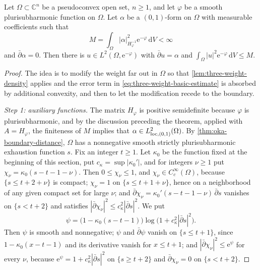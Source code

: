 \begin{theorem}[H\"ormander]\label{thm:hormander-smooth-weight}
Let $\Omega\subset\mathbb C^n$ be a pseudoconvex open set, $n\ge1$, and let $\varphi$ be a smooth plurisubharmonic function on $\Omega$. Let $\alpha$ be a $(0,1)$-form on $\Omega$ with measurable coefficients such that
\[
 M=\int_\Omega|\alpha|_{H_\varphi^{-1}}^2\mathrm e^{-\varphi}\,\mathrm dV<\infty
\]
and $\bar\partial\alpha=0$. Then there is $u\in L^2(\Omega,\mathrm e^{-\varphi})$ with $\bar\partial u=\alpha$ and $\int_\Omega|u|^2\mathrm e^{-\varphi}\,\mathrm dV\le M$.
\end{theorem}
\begin{proof}
The idea is to modify the weight far out in $\Omega$ so that \cref{lem:three-weight-density} applies and the error term in \eqref{eq:three-weight-basic-estimate} is absorbed by additional convexity, and then to let the modification recede to the boundary.

\emph{Step 1: auxiliary functions.} The matrix $H_\varphi$ is positive semidefinite because $\varphi$ is plurisubharmonic, and by the discussion preceding the theorem, applied with $A=H_\varphi$, the finiteness of $M$ implies that $\alpha\in L^2_{\mathrm{loc},(0,1)}(\Omega)$. By \cref{thm:oka-boundary-distance}, $\Omega$ has a nonnegative smooth strictly plurisubharmonic exhaustion function $s$. Fix an integer $t\ge1$. Let $\kappa_0$ be the function fixed at the beginning of this section, put $c_\kappa=\sup|\kappa_0'|$, and for integers $\nu\ge1$ put $\chi_\nu=\kappa_0(s-t-1-\nu)$. Then $0\le\chi_\nu\le1$, and $\chi_\nu\in C^\infty_c(\Omega)$, because $\{s\le t+2+\nu\}$ is compact; $\chi_\nu=1$ on $\{s\le t+1+\nu\}$, hence on a neighborhood of any given compact set for large $\nu$; and $\bar\partial\chi_\nu=\kappa_0'(s-t-1-\nu)\,\bar\partial s$ vanishes on $\{s<t+2\}$ and satisfies $|\bar\partial\chi_\nu|^2\le c_\kappa^2|\bar\partial s|^2$. We put
\[
 \psi=\bigl(1-\kappa_0(s-t-1)\bigr)\log\bigl(1+c_\kappa^2|\bar\partial s|^2\bigr).
\]
Then $\psi$ is smooth and nonnegative; $\psi$ and $\bar\partial\psi$ vanish on $\{s\le t+1\}$, since $1-\kappa_0(x-t-1)$ and its derivative vanish for $x\le t+1$; and $|\bar\partial\chi_\nu|^2\le\mathrm e^\psi$ for every $\nu$, because $\mathrm e^\psi=1+c_\kappa^2|\bar\partial s|^2$ on $\{s\ge t+2\}$ and $\bar\partial\chi_\nu=0$ on $\{s<t+2\}$.


\end{proof}
